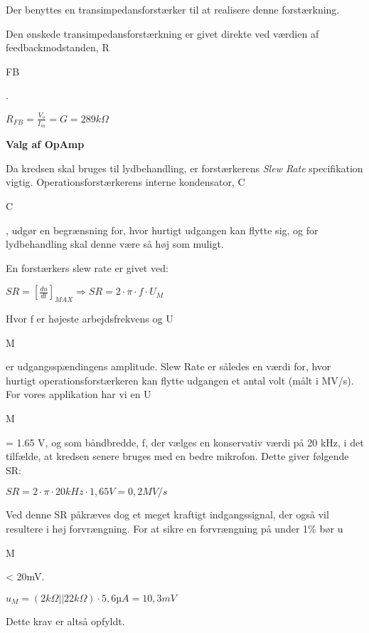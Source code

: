 Der benyttes en transimpedansforstærker til at realisere denne forstærkning. 

Den ønskede transimpedansforstærkning er givet direkte ved værdien af feedbackmodstanden, R\begin{tiny}FB\end{tiny}.
\begin{center}
${ R }_{ FB }=\frac { { V }_{ o } }{ { I }_{ in } } =G=289k\Omega$
\end{center}

\textbf{Valg af OpAmp}

Da kredsen skal bruges til lydbehandling, er forstærkerens \textit{Slew Rate} specifikation vigtig.
Operationsforstærkerens interne kondensator, C\begin{tiny}C\end{tiny}, udgør en begrænsning for, hvor hurtigt udgangen kan flytte sig, og for lydbehandling skal denne være så høj som muligt.

En forstærkers slew rate er givet ved:
\begin{center}
$SR={ \left[ \frac { du }{ dt }  \right]  }_{ MAX }\Rightarrow SR=2\cdot \pi \cdot f\cdot { U }_{ M }$
\end{center}
Hvor f er højeste arbejdsfrekvens og U\begin{tiny}M\end{tiny} er udgangsspændingens amplitude. Slew Rate er således en værdi for, hvor hurtigt operationsforstærkeren kan flytte udgangen et antal volt (målt i MV/s).
For vores applikation har vi en U\begin{tiny}M\end{tiny} = 1.65 V, og som båndbredde, f, der vælges en konservativ værdi på 20 kHz, i det tilfælde, at kredsen senere bruges med en bedre mikrofon. Dette giver følgende SR:
\begin{center}
$SR=2\cdot \pi \cdot 20kHz\cdot 1,65V=0,2MV/s$
\end{center}

Ved denne SR påkræves dog et meget kraftigt indgangssignal, der også vil resultere i høj forvrængning. For at sikre en forvrængning på under 1\% bør u\begin{tiny}M\end{tiny} < 20mV.
\begin{center}
${ u }_{ M }=(2k\Omega ||22k\Omega )\cdot { 5,6µA=10,3mV }$
\end{center}
Dette krav er altså opfyldt.

